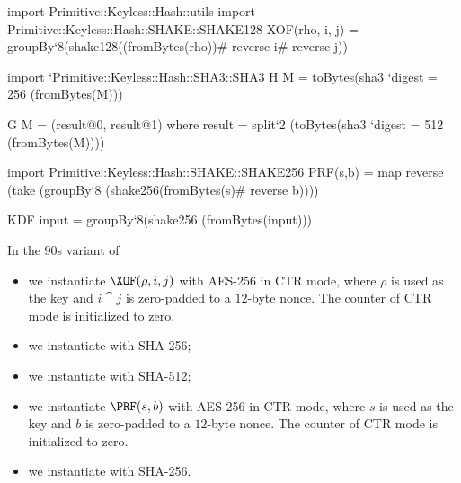 \begin{code}
  import Primitive::Keyless::Hash::utils
  import Primitive::Keyless::Hash::SHAKE::SHAKE128
  XOF(rho, i, j) = groupBy`{8}(shake128((fromBytes(rho))# reverse i# reverse j))
  
  import `Primitive::Keyless::Hash::SHA3::SHA3
  H M = toBytes(sha3 `{digest = 256} (fromBytes(M)))
  
  G M = (result@0, result@1)
      where result = split`{2} (toBytes(sha3 `{digest = 512} (fromBytes(M))))
  
  import Primitive::Keyless::Hash::SHAKE::SHAKE256
  PRF(s,b) = map reverse (take (groupBy`{8} (shake256(fromBytes(s)# reverse b))))
  
  KDF input = groupBy`{8}(shake256 (fromBytes(input)))
\end{code}

In the 90s variant of \Kyber
\begin{itemize}
  \item we instantiate $\XOF(\rho,i,j)$ with AES-256 in CTR mode, where $\rho$ is used as the key and $i\cat j$ is zero-padded to a $12$-byte nonce.
    The counter of CTR mode is initialized to zero.
  \item we instantiate \ROH with SHA-256;
  \item we instantiate \ROG with SHA-512;
  \item we instantiate $\PRF(s,b)$ with AES-256 in CTR mode, where $s$ is used as the key and $b$ is zero-padded to a $12$-byte nonce.
    The counter of CTR mode is initialized to zero.
  \item we instantiate \KDF with SHA-256.
\end{itemize}
